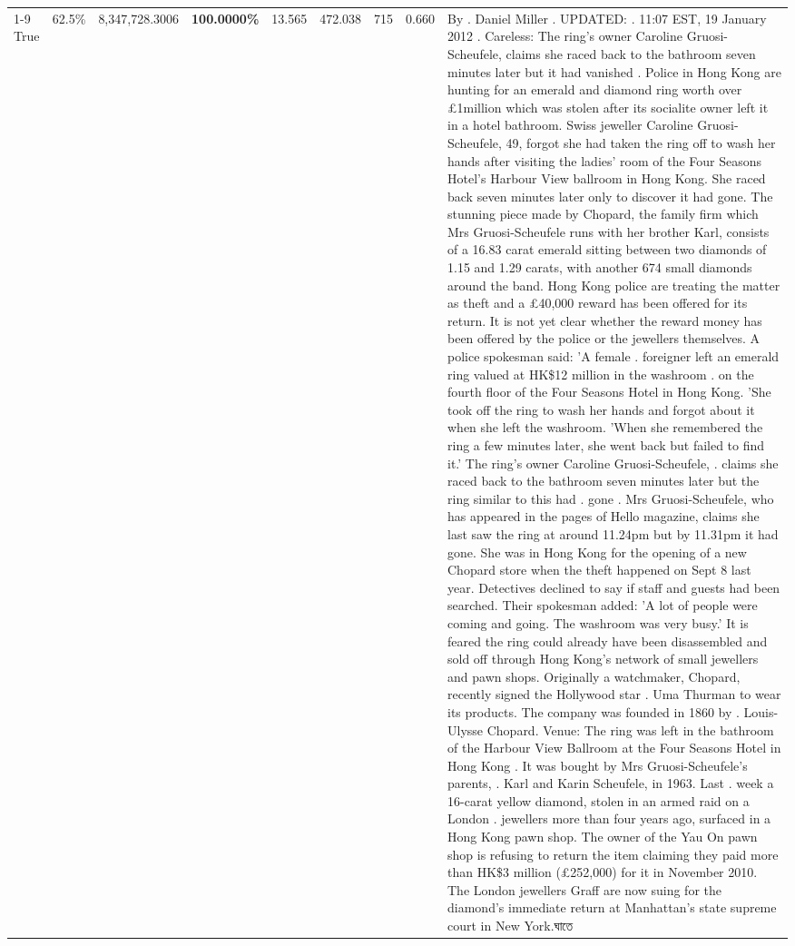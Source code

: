 \begin{table}[H]
\begin{tabular}{lllrlllll}
\cline{1-9}
True & 62.5\% & 8,347,728.3006 & \bfseries \color{red} 100.0000\% & 13.565 & 472.038 & 715 & 0.660 & By . Daniel Miller . UPDATED: . 11:07 EST, 19 January 2012 . Careless: The ring's owner Caroline Gruosi-Scheufele, claims she raced back to the bathroom seven minutes later but it had vanished . Police in Hong Kong are hunting for an emerald and diamond ring worth over £1million which was stolen after its socialite owner left it in a hotel bathroom. Swiss jeweller Caroline Gruosi-Scheufele, 49, forgot she had taken the ring off to wash her hands after visiting the ladies' room of the Four Seasons Hotel's Harbour View ballroom in Hong Kong. She raced back seven minutes later only to discover it had gone. The stunning piece made by Chopard, the family firm which Mrs Gruosi-Scheufele runs with her brother Karl, consists of a 16.83 carat emerald sitting between two diamonds of 1.15 and 1.29 carats, with another 674 small diamonds around the band. Hong Kong police are treating the matter as theft and a £40,000 reward has been offered for its return. It is not yet clear whether the reward money has been offered by the police or the jewellers themselves. A police spokesman said: 'A female . foreigner left an emerald ring valued at HK\$12 million in the washroom . on the fourth floor of the Four Seasons Hotel in Hong Kong. 'She took off the ring to wash her hands and forgot about it when she left the washroom. 'When she remembered the ring a few minutes later, she went back but failed to find it.' The ring's owner Caroline Gruosi-Scheufele, . claims she raced back to the bathroom seven minutes later but the ring similar to this had . gone . Mrs Gruosi-Scheufele, who has appeared in the pages of Hello magazine, claims she last saw the ring at around 11.24pm but by 11.31pm it had gone. She was in Hong Kong for the opening of a new Chopard store when the theft happened on Sept 8 last year. Detectives declined to say if staff and guests had been searched. Their spokesman added: 'A lot of people were coming and going. The washroom was very busy.' It is feared the ring could already have been disassembled and sold off through Hong Kong's network of small jewellers and pawn shops. Originally a watchmaker, Chopard, recently signed the Hollywood star . Uma Thurman to wear its products. The company was founded in 1860 by . Louis-Ulysse Chopard. Venue: The ring was left in the bathroom of the Harbour View Ballroom at the Four Seasons Hotel in Hong Kong . It was bought by Mrs Gruosi-Scheufele's  parents, . Karl and Karin Scheufele, in 1963. Last . week a 16-carat yellow diamond, stolen in an armed raid on a London . jewellers more than four years ago, surfaced in a Hong Kong pawn shop. The owner of the Yau On pawn shop is refusing to return the item claiming they paid more than HK\$3 million (£252,000) for it in November 2010. The London jewellers Graff are now suing for the diamond’s immediate return at Manhattan’s state supreme court in New York.ঘাতে \\

\end{tabular}
\end{table}
